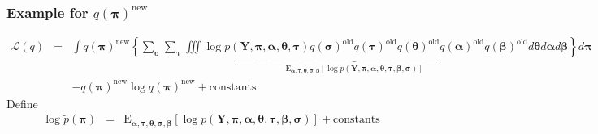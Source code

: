 \documentclass{beamer}
\numberwithin{equation}{section}
\begin{document}
\begin{frame}
\frametitle{Example for $q(\boldsymbol{\pi})^{\text{new}}$} \tiny
\begin{eqnarray}
\mathcal{L}(q) & =& \int q(\boldsymbol{\pi})^{\text{new}}
\underbrace{\left\{ \sum_{\boldsymbol{\sigma}}
\sum_{\boldsymbol{\tau}} \iiint \log p(\boldsymbol{Y},
\boldsymbol{\pi}, \boldsymbol{\alpha}, \boldsymbol{\theta},
\boldsymbol{\tau})
q(\boldsymbol{\sigma})^{\text{old}}q(\boldsymbol{\tau})^{\text{old}}q(\boldsymbol{\theta})^{\text{old}}q(\boldsymbol{\alpha})^{\text{old}}q(\boldsymbol{\beta})^{\text{old}}
d\boldsymbol{\theta} d\boldsymbol{\alpha}
d\boldsymbol{\beta}\right\}}_{\text{E}_{\boldsymbol{\alpha},
\boldsymbol{\tau}, \boldsymbol{\theta}, \boldsymbol{\sigma},
\boldsymbol{\beta} }[\log p(\boldsymbol{Y}, \boldsymbol{\pi},
\boldsymbol{\alpha},
\boldsymbol{\theta}, \boldsymbol{\tau}, \boldsymbol{\beta}, \boldsymbol{\sigma})]}d\boldsymbol{\pi} \nonumber \\
&&- q(\boldsymbol{\pi})^{\text{new}}\log
q(\boldsymbol{\pi})^{\text{new}} + \text{constants} \nonumber
\end{eqnarray}
\normalsize Define
\begin{eqnarray}
\log \tilde{p}(\boldsymbol{\pi}) & = &
\text{E}_{\boldsymbol{\alpha}, \boldsymbol{\tau},
\boldsymbol{\theta}, \boldsymbol{\sigma}, \boldsymbol{\beta} }[\log
p(\boldsymbol{Y}, \boldsymbol{\pi}, \boldsymbol{\alpha},
\boldsymbol{\theta}, \boldsymbol{\tau}, \boldsymbol{\beta},
\boldsymbol{\sigma})] + \text{constants} \nonumber
\end{eqnarray}


\end{frame}
\end{document}
